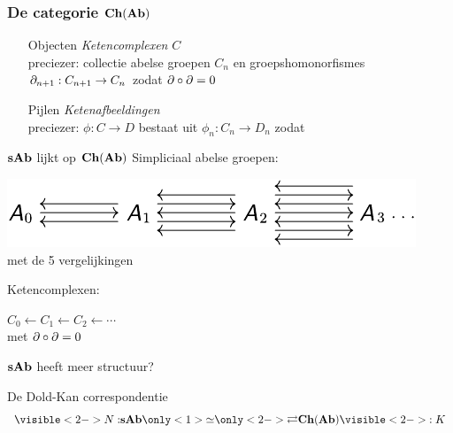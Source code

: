 \documentclass[14pt]{beamer}
\newcommand{\from}{\leftarrow}
\begin{document}
\begin{frame}
	\frametitle{De categorie $\mathbf{Ch}(\mathbf{Ab})$}
	\begin{itemize}
		\item[Objecten] \emph{Ketencomplexen} $C$ \\
		preciezer: collectie abelse groepen $C_n$ en groepshomonorfismes $\partial_{n+1}: C_{n+1} \to C_n$ zodat $\partial \circ \partial = 0$
		\item[Pijlen] \emph{Ketenafbeeldingen} \\
		preciezer: $\phi: C \to D$ bestaat uit $\phi_n: C_n \to D_n$ zodat \\
	\end{itemize}
\end{frame}

\begin{frame}{$\mathbf{sAb}$ lijkt op $\mathbf{Ch}(\mathbf{Ab})$}
Simpliciaal abelse groepen:
\begin{center}
	\includegraphics{simplicial_abgrp} \\
	met de 5 vergelijkingen
\end{center}

Ketencomplexen:
\begin{center}
	$ C_0 \from C_1 \from C_2 \from \cdots $ \\
	met $\partial \circ \partial = 0$
\end{center}

\pause $\mathbf{sAb}$ heeft meer structuur?
\end{frame}

\begin{frame}{De Dold-Kan correspondentie}
	$$ \visible<2->{N:} \sAb \only<1>{\simeq} \only<2->{\rightleftarrows} \Ch{\Ab} \visible<2->{:K} $$
	

	\bigskip{}
\end{frame}
\end{document}

